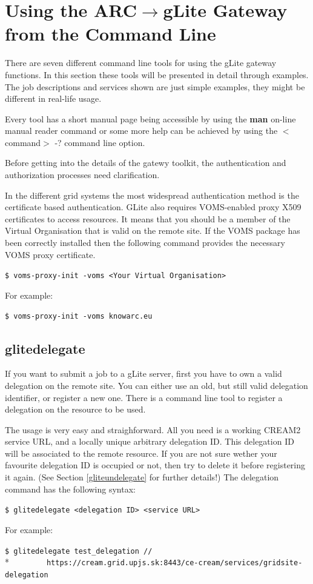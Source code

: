 \documentclass{article}
\begin{document}
\section{Using the ARC${\rightarrow}$gLite Gateway from the Command Line}
\label{Users guide}
There are seven different command line tools for using the gLite gateway functions. In this section these tools will be presented in detail through examples. The job descriptions and services shown are just simple examples, they might be different in real-life usage.\par
Every tool has a short manual page being accessible by using the \textbf{man} on-line manual reader command or some more help can be achieved by using the $<$command$>$ -? command line option.\par
Before getting into the details of the gatewy toolkit, the authentication and authorization processes need clarification.\par
In the different grid systems the most widespread authentication method is the certificate based authentication. GLite also requires VOMS-enabled proxy X509 certificates to access resources. It means that you should be a member of the Virtual Organisation that is valid on the remote site. If the VOMS package has been correctly installed then the following command provides the necessary VOMS proxy certificate.\par
\begin{shaded}\verb#$ voms-proxy-init -voms <Your Virtual Organisation>#\end{shaded}
For example:
\begin{shaded}\verb#$ voms-proxy-init -voms knowarc.eu#\end{shaded}
\subsection{glitedelegate}
\label{glitedelegate}
If you want to submit a job to a gLite server, first you have to own a valid delegation on the remote site. You can either use an old, but still valid delegation identifier, or register a new one. There is a command line tool to register a delegation on the resource to be used.\par
The usage is very easy and straighforward. All you need is a working CREAM2 service URL, and a locally unique arbitrary delegation ID. This delegation ID will be associated to the remote resource. If you are not sure wether your favourite delegation ID is occupied or not, then try to delete it before registering it again. (See Section \ref{gliteundelegate} for further details!) The delegation command has the following syntax:
\begin{shaded}\verb#$ glitedelegate <delegation ID> <service URL>#\end{shaded}
For example:
\begin{shaded}\verb#$ glitedelegate test_delegation //#\\*
\verb#        https://cream.grid.upjs.sk:8443/ce-cream/services/gridsite-delegation#\end{shaded}
\end{document}
